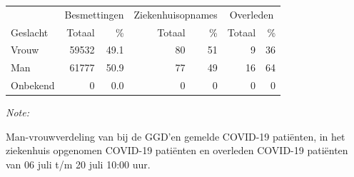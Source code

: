\documentclass[
  english,
  man,floatsintext]{apa6}
\begin{document}
\begin{table}
\centering\begingroup\fontsize{11}{13}\selectfont

\begin{threeparttable}
\begin{tabular}{lrrrrrr}
\toprule
\multicolumn{1}{c}{ } & \multicolumn{2}{c}{Besmettingen} & \multicolumn{2}{c}{Ziekenhuisopnames} & \multicolumn{2}{c}{Overleden} \\
\cmidrule(l{3pt}r{3pt}){2-3} \cmidrule(l{3pt}r{3pt}){4-5} \cmidrule(l{3pt}r{3pt}){6-7}
Geslacht & Totaal & \% & Totaal & \% & Totaal & \%\\
\midrule
Vrouw & 59532 & 49.1 & 80 & 51 & 9 & 36\\
Man & 61777 & 50.9 & 77 & 49 & 16 & 64\\
Onbekend & 0 & 0.0 & 0 & 0 & 0 & 0\\
\bottomrule
\end{tabular}
\begin{tablenotes}
\item \textit{Note: } 
\item Man-vrouwverdeling van bij de GGD’en gemelde COVID-19 patiënten, in het ziekenhuis opgenomen COVID-19 patiënten en overleden COVID-19 patiënten van 06 juli t/m 20 juli 10:00 uur.
\end{tablenotes}
\end{threeparttable}
\endgroup{}
\end{table}
\newpage
\end{document}
